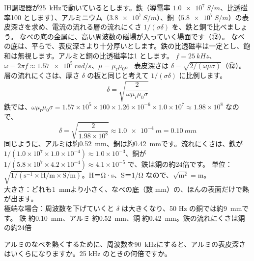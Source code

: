 \label{ph:電-8:ex10}
\begin{phreidai}
IH調理器が\qty{25}{kHz}で動いているとします。鉄（導電率 $\qty{1.0e7}{S/m}$、比透磁率100 とします）、アルミニウム（$\qty{3.8e7}{S/m}$）、銅（$\qty{5.8e7}{S/m}$）の表皮深さを求め、電流の流れる層の流れにくさ $1/(\sigma\delta)$ を、鉄と銅で比べましょう。
\phbamen
なべの底の金属に、高い周波数の磁場が入っていく場面です（⑫）。
\phmushi
なべの底は、平らで、表皮深さより十分厚いとします。鉄の比透磁率は一定とし、飽和は無視します。アルミと銅の比透磁率は1 とします。
\phzu
$f=\qty{25}{kHz}$、$\omega=2\pi f\approx\qty{1.57e5}{rad/s}$、$\mu=\mu_{\mathrm r}\mu_0$。
\phriyu
表皮深さは $\delta=\sqrt{2/(\omega\mu\sigma)}$（⑫）。層の流れにくさは、厚さ $\delta$ の板と同じと考えて $1/(\sigma\delta)$ に比例します。
\phtateru
\[ \delta=\sqrt{\frac{2}{\omega\mu_{\mathrm r}\mu_0\sigma}} \]
\phtoku
鉄では、$\omega\mu_{\mathrm r}\mu_0\sigma=1.57\times10^5\times100\times1.26\times10^{-6}\times1.0\times10^{7}\approx1.98\times10^{8}$ なので、
\[ \delta=\sqrt{\frac{2}{1.98\times10^{8}}}\approx\qty{1.0e-4}{m}=\qty{0.10}{mm} \]
同じように、アルミは約\qty{0.52}{mm}、銅は約\qty{0.42}{mm}です。流れにくさは、鉄が $1/(1.0\times10^7\times1.0\times10^{-4})\approx1.0\times10^{-3}$、銅が $1/(5.8\times10^7\times4.2\times10^{-4})\approx4.1\times10^{-5}$ で、鉄は銅の約24倍です。
\phtashikame
単位：$\sqrt{1/(\mathrm{s^{-1}}\times\mathrm{H/m}\times\mathrm{S/m})}$。H＝Ω·s、S＝1/Ω なので、$\sqrt{\mathrm{m^2}}=\mathrm{m}$。\\
大きさ：どれも\qty{1}{mm}より小さく、なべの底（数 mm）の、ほんの表面だけで熱が出ます。\\
極端な場合：周波数を下げていくと $\delta$ は大きくなり、50 Hz の銅では約\qty{9}{mm}です。
\kotae 鉄 約\qty{0.10}{mm}、アルミ 約\qty{0.52}{mm}、銅 約\qty{0.42}{mm}。鉄の流れにくさは銅の約24倍
\end{phreidai}
\begin{jibun}
アルミのなべを熱くするために、周波数を\qty{90}{kHz}にすると、アルミの表皮深さはいくらになりますか。25 kHz のときの何倍ですか。
\end{jibun}

